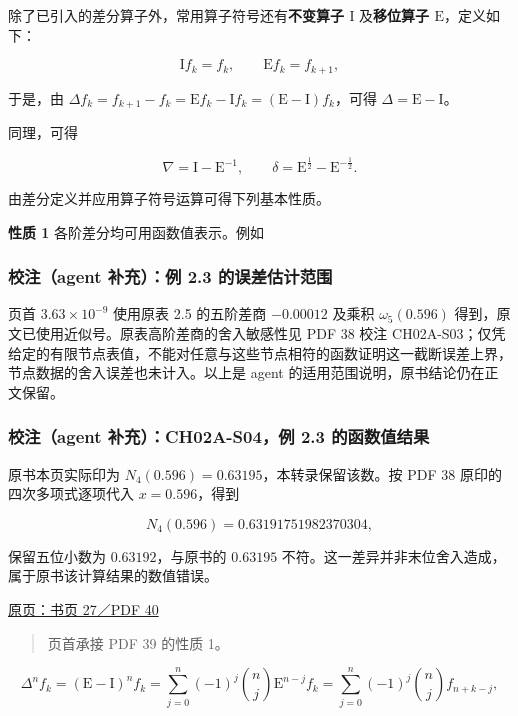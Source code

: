 \documentclass[
  10pt,
  fontset=fandol]{ctexart}
\begin{document}
除了已引入的差分算子外，常用算子符号还有\textbf{不变算子 \(\mathrm{I}\)} 及\textbf{移位算子 \(\mathrm{E}\)}，定义如下：

\[
\mathrm{I}f_k=f_k,\qquad\mathrm{E}f_k=f_{k+1},
\]

于是，由 \(\Delta f_k=f_{k+1}-f_k=\mathrm{E}f_k-\mathrm{I}f_k=(\mathrm{E}-\mathrm{I})f_k\)，可得 \(\Delta=\mathrm{E}-\mathrm{I}\)。

同理，可得

\[
\nabla=\mathrm{I}-\mathrm{E}^{-1},\qquad
\delta=\mathrm{E}^{\frac12}-\mathrm{E}^{-\frac12}.
\]

由差分定义并应用算子符号运算可得下列基本性质。

\textbf{性质 1} 各阶差分均可用函数值表示。例如

\subsubsection{校注（agent 补充）：例 2.3 的误差估计范围}\label{ux6821ux6ce8agent-ux8865ux5145ux4f8b-2.3-ux7684ux8befux5deeux4f30ux8ba1ux8303ux56f4}

页首 \(3.63\times10^{-9}\) 使用原表 2.5 的五阶差商 \(-0.00012\) 及乘积 \(\omega_5(0.596)\) 得到，原文已使用近似号。原表高阶差商的舍入敏感性见 PDF 38 校注 CH02A-S03；仅凭给定的有限节点表值，不能对任意与这些节点相符的函数证明这一截断误差上界，节点数据的舍入误差也未计入。以上是 agent 的适用范围说明，原书结论仍在正文保留。

\subsubsection{校注（agent 补充）：CH02A-S04，例 2.3 的函数值结果}\label{ux6821ux6ce8agent-ux8865ux5145ch02a-s04ux4f8b-2.3-ux7684ux51fdux6570ux503cux7ed3ux679c}

原书本页实际印为 \(N_4(0.596)=0.63195\)，本转录保留该数。按 PDF 38 原印的四次多项式逐项代入 \(x=0.596\)，得到

\[
N_4(0.596)=0.63191751982370304,
\]

保留五位小数为 \(0.63192\)，与原书的 \(0.63195\) 不符。这一差异并非末位舍入造成，属于原书该计算结果的数值错误。

\href{../../source-images/pdf-040.jpeg}{原页：书页 27／PDF 40}

\begin{quote}
页首承接 PDF 39 的性质 1。
\end{quote}

\[
\Delta^n f_k=(\mathrm{E}-\mathrm{I})^n f_k
=\sum_{j=0}^{n}(-1)^j\binom{n}{j}\mathrm{E}^{n-j}f_k
=\sum_{j=0}^{n}(-1)^j\binom{n}{j}f_{n+k-j},
\tag{2.5.4}
\]
\end{document}
